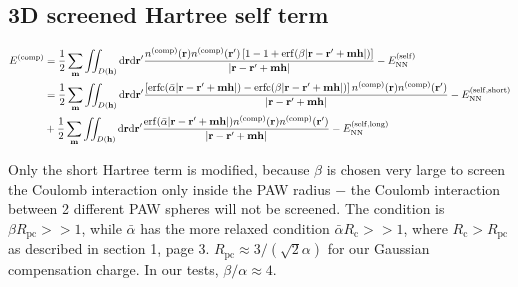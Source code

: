 \documentclass[paper=a4, fontsize=11pt]{article} %
\numberwithin{equation}{section} %
\numberwithin{figure}{section} %
\numberwithin{table}{section} %
\newcommand{\bh}{{\bf{h}}}
\newcommand{\bm}{{\bf{m}}}
\newcommand{\br}{{\bf{r}}}
\newcommand{\rNN}{{\mathrm{NN}}}
\newcommand{\rself}{{\mathrm{self}}}
\newcommand{\rshort}{{\mathrm{short}}}
\newcommand{\rlong}{{\mathrm{long}}}
\newcommand{\rerf}{{\mathrm{erf}}}
\newcommand{\rerfc}{{\mathrm{erfc}}}
\newcommand{\rd}{{\mathrm{d}}}
\newcommand{\rcomp}{{\mathrm{comp}}}
\newcommand{\al}{{\alpha}}
\newcommand{\Rc}{{R_{\mathrm{c}}}}
\newcommand{\Rpc}{{R_{\mathrm{pc}}}}
\newcommand{\bal}{{\bar{\alpha}}}
\begin{document}
\subsection{3D screened Hartree self term}
\begin{equation}
\begin{split}
E^{(\rcomp)} 
&= \frac{1}{2}\sum_\bm \iint_{D(\bh)} \rd \br \rd \br' \frac{n^{(\rcomp)}(\br)n^{(\rcomp)}(\br')\left[1-1+\rerf(\beta|\br-\br'+\bm\bh|)\right]}{|\br-\br'+\bm\bh|} - E_{\rNN}^{(\rself)}\\
&= \frac{1}{2}\sum_\bm \iint_{D(\bh)} \rd \br \rd \br' \frac{\left[\rerfc(\bal |\br-\br'+\bm\bh|)- \rerfc(\beta|\br-\br'+\bm\bh|) \right]n^{(\rcomp)}(\br)n^{(\rcomp)}(\br')}{|\br-\br'+\bm\bh|} - E_{\rNN}^{(\rself,\rshort)} \\
&+ \frac{1}{2}\sum_\bm \iint_{D(\bh)} \rd \br \rd \br' \frac{\rerf(\bal |\br-\br'+\bm\bh|)n^{(\rcomp)}(\br)n^{(\rcomp)}(\br')}{|\br-\br'+\bm\bh|} - E_{\rNN}^{(\rself,\rlong)} \\
\end{split}
\end{equation}

Only the short Hartree term is modified, because $\beta$ is chosen very large to screen the Coulomb interaction only inside the PAW radius $-$ the Coulomb interaction between 2 different PAW spheres will not be screened. The condition is $\beta \Rpc >> 1$, while $\bal$ has the more relaxed condition $\bal \Rc >> 1$, where $\Rc > \Rpc$ as described in section 1, page 3. $\Rpc \approx 3/(\sqrt{2}\al)$ for our Gaussian compensation charge. In our tests, $\beta/\al \approx 4$.
\end{document}
